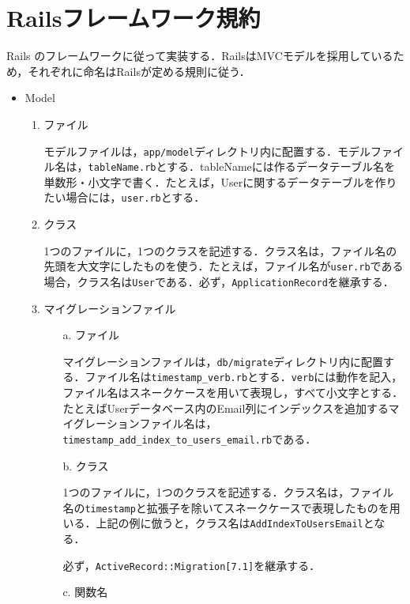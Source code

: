 \newpage

\section{Railsフレームワーク規約}\label{q3.2}
Rails のフレームワークに従って実装する．RailsはMVCモデルを採用しているため，それぞれに命名はRailsが定める規則に従う．
\begin{itemize}
    \item Model
    \begin{enumerate}
        \item ファイル
        
        モデルファイルは，\texttt{app/model}ディレクトリ内に配置する．モデルファイル名は，\texttt{tableName.rb}とする．{{tableName}}には作るデータテーブル名を単数形・小文字で書く．たとえば，Userに関するデータテーブルを作りたい場合には，\texttt{user.rb}とする．
        
        \item クラス

        1つのファイルに，1つのクラスを記述する．クラス名は，ファイル名の先頭を大文字にしたものを使う．たとえば，ファイル名が\texttt{user.rb}である場合，クラス名は\texttt{User}である．必ず，\texttt{ApplicationRecord}を継承する．
        
        \item マイグレーションファイル
        \begin{enumerate}
            \item[a.] ファイル
            
            マイグレーションファイルは，\texttt{db/migrate}ディレクトリ内に配置する．ファイル名は\texttt{timestamp\_verb.rb}とする．\texttt{verb}には動作を記入，ファイル名はスネークケースを用いて表現し，すべて小文字とする．たとえばUserデータベース内のEmail列にインデックスを追加するマイグレーションファイル名は，\texttt{timestamp\_add\_index\_to\_users\_email.rb}である．
            \item[b.] クラス

            1つのファイルに，1つのクラスを記述する．クラス名は，ファイル名の\texttt{timestamp}と拡張子を除いてスネークケースで表現したものを用いる．上記の例に倣うと，クラス名は\texttt{AddIndexToUsersEmail}となる．
            
            必ず，\texttt{ActiveRecord::Migration[7.1]}を継承する．

            \item[c.] 関数名


\end{enumerate}
\end{enumerate}
\end{itemize}
